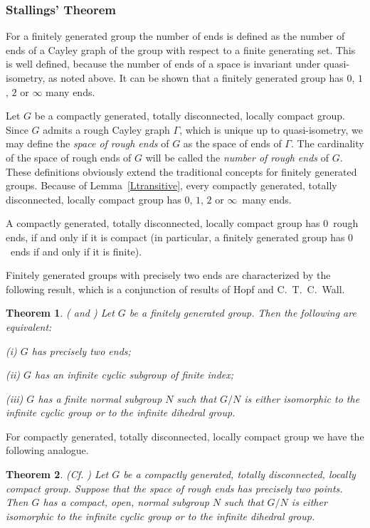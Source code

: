 \documentclass{emsprocart}
\newtheorem{theorem}{Theorem}[section]
\theoremstyle{definition}
\begin{document}
\subsubsection{Stallings' Theorem}
For a finitely generated group the number of ends is defined as the
number of ends of a Cayley graph of the group with respect to a finite
generating set. This is well defined, because the number of ends of a space is
invariant under quasi-isometry, as noted above.  It can be shown
that a finitely generated group has  $0$, $1$, $2$ or $\infty$ many ends.

Let $G$ be a compactly generated, totally disconnected, locally
compact group. Since $G$ admits a rough Cayley graph $\Gamma$,
which is unique up to quasi-isometry, we may define the
\emph{space of rough ends} of $G$ as the space of ends of $\Gamma$.
The cardinality of the space of rough ends of $G$ will be called the
\emph{number of rough ends} of $G$. These definitions obviously
extend the traditional concepts for finitely generated groups.
Because of Lemma~\ref{Ltransitive}, every compactly generated, totally
disconnected, locally compact group has  $0$, $1$, $2$ or
$\infty$~many ends.

A compactly generated, totally disconnected, locally compact group
has $0$~rough ends, if and only if it is compact (in particular, a finitely
generated group has $0$~ends if and only if it is finite).

Finitely generated groups with precisely two ends are characterized by
the following
result, which is a conjunction of results of Hopf and C.~T.~C.~Wall.

\begin{theorem}\label{TTwoEnds}
{\rm (\cite[Satz 5]{Hopf1944} and \cite[Lemma~4.1]{Wall1967})}
Let $G$ be a finitely generated group.  Then the following
are equivalent:

(i)  $G$ has precisely two ends;

(ii)  $G$ has an infinite cyclic subgroup of finite index;

(iii)  $G$ has a finite normal subgroup $N$ such that $G/N$ is
either isomorphic to the infinite cyclic group or to the infinite
dihedral group.
\end{theorem}

For compactly generated, totally disconnected, locally compact group we
have the following analogue.

\begin{theorem}\label{TStructertree_two} {\rm
    (Cf. \cite{MollerSeifter1998})}
Let $G$ be a compactly generated, totally disconnected, locally compact
group.  Suppose that the space of rough ends has precisely two
points. Then $G$ has a compact, open, normal subgroup $N$ such that
$G/N$ is either isomorphic to the infinite cyclic group or to the infinite
dihedral group.
\end{theorem}
\end{document}

